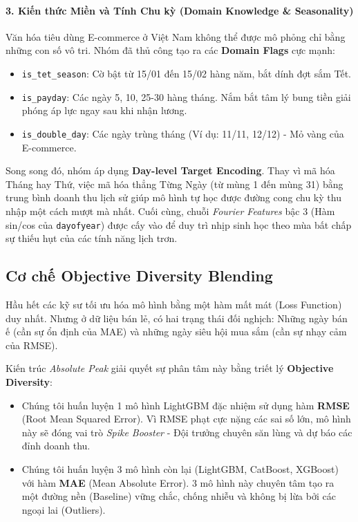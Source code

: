 \documentclass{article}
\begin{document}
\paragraph{3. Kiến thức Miền và Tính Chu kỳ (Domain Knowledge \& Seasonality)}
Văn hóa tiêu dùng E-commerce ở Việt Nam không thể được mô phỏng chỉ bằng những con số vô tri. Nhóm đã thủ công tạo ra các \textbf{Domain Flags} cực mạnh:
\begin{itemize}[noitemsep]
    \item \texttt{is\_tet\_season}: Cờ bật từ 15/01 đến 15/02 hàng năm, bắt dính đợt sắm Tết.
    \item \texttt{is\_payday}: Các ngày 5, 10, 25-30 hàng tháng. Nắm bắt tâm lý bung tiền giải phóng áp lực ngay sau khi nhận lương.
    \item \texttt{is\_double\_day}: Các ngày trùng tháng (Ví dụ: 11/11, 12/12) - Mỏ vàng của E-commerce.
\end{itemize}
Song song đó, nhóm áp dụng \textbf{Day-level Target Encoding}. Thay vì mã hóa Tháng hay Thứ, việc mã hóa thẳng Từng Ngày (từ mùng 1 đến mùng 31) bằng trung bình doanh thu lịch sử giúp mô hình tự học được đường cong chu kỳ thu nhập một cách mượt mà nhất. Cuối cùng, chuỗi \textit{Fourier Features} bậc 3 (Hàm sin/cos của \texttt{dayofyear}) được cấy vào để duy trì nhịp sinh học theo mùa bất chấp sự thiếu hụt của các tính năng lịch trơn.

\subsection{Cơ chế Objective Diversity Blending}

Hầu hết các kỹ sư tối ưu hóa mô hình bằng một hàm mất mát (Loss Function) duy nhất. Nhưng ở dữ liệu bán lẻ, có hai trạng thái đối nghịch: Những ngày bán ế (cần sự ổn định của MAE) và những ngày siêu hội mua sắm (cần sự nhạy cảm của RMSE).

Kiến trúc \textit{Absolute Peak} giải quyết sự phân tâm này bằng triết lý \textbf{Objective Diversity}:
\begin{itemize}
    \item Chúng tôi huấn luyện 1 mô hình LightGBM đặc nhiệm sử dụng hàm \textbf{RMSE} (Root Mean Squared Error). Vì RMSE phạt cực nặng các sai số lớn, mô hình này sẽ đóng vai trò \textit{Spike Booster} - Đội trưởng chuyên săn lùng và dự báo các đỉnh doanh thu.
    \item Chúng tôi huấn luyện 3 mô hình còn lại (LightGBM, CatBoost, XGBoost) với hàm \textbf{MAE} (Mean Absolute Error). 3 mô hình này chuyên tâm tạo ra một đường nền (Baseline) vững chắc, chống nhiễu và không bị lừa bởi các ngoại lai (Outliers).
\end{itemize}
\end{document}
